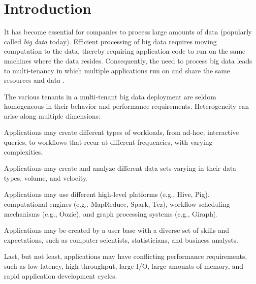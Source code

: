
\section{Introduction}
\label{sec:intro}

It has become essential for companies to process large amounts of data (popularly called {\em big data} today). Efficient processing of big data requires moving computation to the data, thereby requiring application code to run on the same machines where the data resides. Consequently, the need to process big data leads to multi-tenancy in which multiple applications run on and share the same resources and data \cite{mesos,yarn,ghodsi11,isard09}.

The various tenants in a multi-tenant big data deployment are seldom 
homogeneous in their behavior and performance requirements.
Heterogeneity can arise along multiple dimensions: 

\squishlist

\item Applications may create different types of workloads, from ad-hoc, interactive queries, to workflows that recur at different frequencies, with varying complexities.

\item Applications may create and analyze different data sets varying in their data types, volume, and velocity.

\item Applications may use different high-level platforms (e.g., Hive, Pig), computational engines (e.g., MapReduce, Spark, Tez), workflow scheduling mechanisms (e.g., Oozie), and graph processing systems (e.g., Giraph).

\item Applications may be created by a user base with a diverse set of skills and expectations, such as computer scientists, statisticians, and business analysts.

\item Last, but not least, applications may have conflicting performance requirements, such as low latency, high throughput, large I/O, large amounts of memory, and rapid application development cycles.

\squishend 


